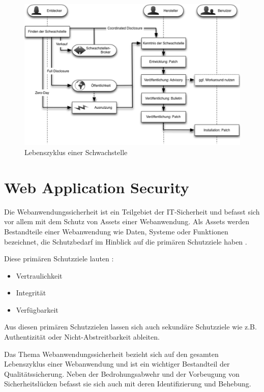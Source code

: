 \documentclass[12pt,oneside,a4paper,parskip,pointlessnumbers]{scrbook}
\begin{document}
  \begin{figure}[H]
    \centering
     \includegraphics[width=1\textwidth]{Images/Lebenszyklus}
    \caption[Lebenszyklus einer Schwachstelle]{Lebenszyklus einer Schwachstelle \cite{BSI3}}
  \end{figure}



  \section{Web Application Security}
  Die Webanwendungssicherheit ist ein Teilgebiet der IT-Sicherheit und befasst sich vor allem mit dem Schutz von Assets einer Webanwendung. Als Assets werden Bestandteile einer Webanwendung wie Daten, Systeme oder Funktionen bezeichnet, die Schutzbedarf im Hinblick auf die primären Schutzziele haben \cite{BSI}.

  Diese primären Schutzziele lauten \cite{BSI}:
    \begin{itemize}
    \item Vertraulichkeit
    \item Integrität
    \item Verfügbarkeit
  \end{itemize}

  Aus diesen primären Schutzzielen lassen sich auch sekundäre Schutzziele wie z.B. Authentizität oder Nicht-Abstreitbarkeit ableiten.

  Das Thema Webanwendungssicherheit bezieht sich auf den gesamten Lebenszyklus einer Webanwendung und ist ein wichtiger Bestandteil der Qualitätssicherung. Neben der Bedrohungsabwehr und der Vorbeugung von Sicherheitslücken befasst sie sich auch mit deren Identifizierung und Behebung. \cite{BSI}
\end{document}
